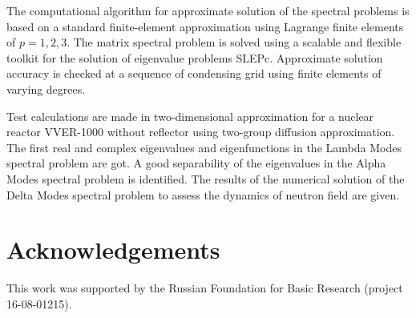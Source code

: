 \documentclass[authoryear]{elsarticle}
\begin{document}
The computational algorithm for approximate solution of the spectral problems is based on a standard finite-element approximation using Lagrange finite elements of  $p=1,2,3$. 
The matrix spectral problem is solved using a scalable and flexible toolkit for the solution of eigenvalue problems SLEPc. Approximate solution accuracy is checked at a sequence of condensing grid using finite elements of varying degrees.

Test calculations are made in two-dimensional approximation for a nuclear reactor VVER-1000 without reflector using two-group diffusion approximation. The first real and complex eigenvalues and eigenfunctions in the Lambda Modes spectral problem are got. A good separability of the eigenvalues in the Alpha Modes spectral problem is identified. The results of the numerical solution of the Delta Modes spectral problem to assess the dynamics of neutron field are given.

\section*{Acknowledgements}

This work was supported by the Russian Foundation for Basic Research (project 16-08-01215).



\end{document}
